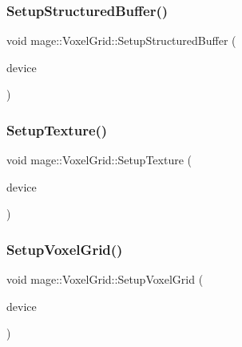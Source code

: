 \hypertarget{classmage_1_1_voxel_grid_ae632716e94bba5d3af94de7998771365}{}\label{classmage_1_1_voxel_grid_ae632716e94bba5d3af94de7998771365} 
\subsubsection{\texorpdfstring{Setup\+Structured\+Buffer()}{SetupStructuredBuffer()}}
{\footnotesize\ttfamily void mage\+::\+Voxel\+Grid\+::\+Setup\+Structured\+Buffer (\begin{DoxyParamCaption}\item[{I\+D3\+D11\+Device5 $\ast$}]{device }\end{DoxyParamCaption})\hspace{0.3cm}{\ttfamily [private]}}

\hypertarget{classmage_1_1_voxel_grid_a52bed8052ca19b3d31a2dd8f0c9c027d}{}\label{classmage_1_1_voxel_grid_a52bed8052ca19b3d31a2dd8f0c9c027d} 
\subsubsection{\texorpdfstring{Setup\+Texture()}{SetupTexture()}}
{\footnotesize\ttfamily void mage\+::\+Voxel\+Grid\+::\+Setup\+Texture (\begin{DoxyParamCaption}\item[{I\+D3\+D11\+Device5 $\ast$}]{device }\end{DoxyParamCaption})\hspace{0.3cm}{\ttfamily [private]}}

\hypertarget{classmage_1_1_voxel_grid_a1bee3c90eb46fc19fa7bce22572a0a4a}{}\label{classmage_1_1_voxel_grid_a1bee3c90eb46fc19fa7bce22572a0a4a} 
\subsubsection{\texorpdfstring{Setup\+Voxel\+Grid()}{SetupVoxelGrid()}}
{\footnotesize\ttfamily void mage\+::\+Voxel\+Grid\+::\+Setup\+Voxel\+Grid (\begin{DoxyParamCaption}\item[{I\+D3\+D11\+Device5 $\ast$}]{device }\end{DoxyParamCaption})\hspace{0.3cm}{\ttfamily [private]}}




